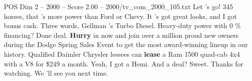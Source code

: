 \begin{textsample}{POS Dim 2 – 2000 – Score 2.00 – 2000/tv\_com\_2000\_105.txt}  \label{ex:f2_pos_081}
Let 's go! 345 horses, that 's more power than Ford or Chevy.
It 's got great looks, and I got bonus cash.
Three words, Gellman 's Turbo Diesel.
Heavy-duty power with 0 \% financing?
Done deal. \textbf{Hurry} in now and join over a million proud new owners during the Dodge Spring Sales Event to get the most award-winning lineup in our history.
Qualified Daimler Chrysler lessees can \textbf{lease} a Ram 1500 quad-cab 4x4 with a V8 for \$249 a month.
Yeah, I got a Hemi.
And a deal?
Sweet.
Thanks for watching.
We 'll see you next time.

\end{textsample}
